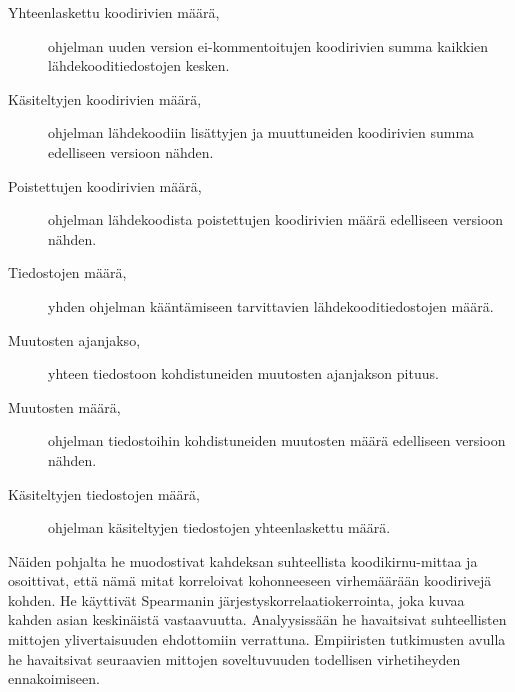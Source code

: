 \documentclass[finnish]{../tktltiki2}
\theoremstyle{definition}
\theoremstyle{remark}
\begin{document}
\begin{description}
    
    \item[Yhteenlaskettu koodirivien määrä,] ohjelman uuden version ei-kommen\-toitujen koodirivien summa kaikkien 
                                             lähdekooditiedostojen kesken.
    
    \item[Käsiteltyjen koodirivien määrä,] ohjelman lähdekoodiin lisättyjen ja muuttuneiden koodirivien summa 
                                           edelliseen versioon nähden.
    
    \item[Poistettujen koodirivien määrä,] ohjelman lähdekoodista poistettujen koodirivien määrä edelliseen versioon 
                                           nähden.
    
    \item[Tiedostojen määrä,] yhden ohjelman kääntämiseen tarvittavien lähdekoodi\-tiedostojen määrä.
    
    \item[Muutosten ajanjakso,] yhteen tiedostoon kohdistuneiden muutosten ajanjakson pituus.
    
    \item[Muutosten määrä,] ohjelman tiedostoihin kohdistuneiden muutosten määrä edelliseen versioon nähden.
    
    \item[Käsiteltyjen tiedostojen määrä,] ohjelman käsiteltyjen tiedostojen yhteenlaskettu määrä.

\end{description}

    Näiden pohjalta he muodostivat kahdeksan suhteellista koodikirnu-mittaa ja osoittivat, että nämä mitat korreloivat 
kohonneeseen virhemäärään koodirivejä kohden. He käyttivät Spearmanin järjestyskorrelaatiokerrointa, joka kuvaa kahden 
asian keskinäistä vastaavuutta. Analyysissään he havaitsivat suhteellisten mittojen ylivertaisuuden ehdottomiin 
verrattuna. Empiiristen tutkimusten avulla he havaitsivat seuraavien mittojen soveltuvuuden todellisen virhetiheyden 
ennakoimiseen.
\end{document}
